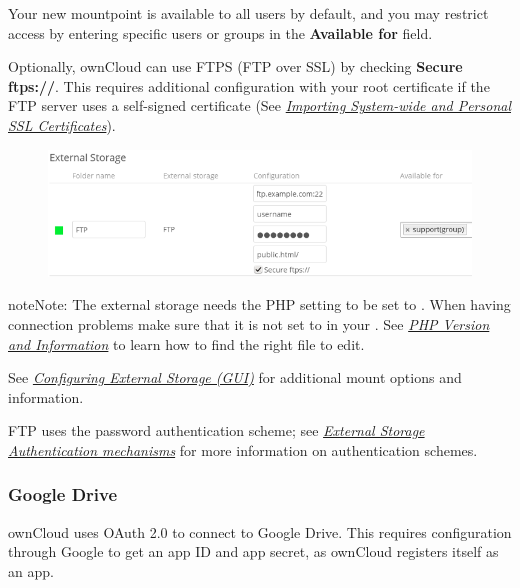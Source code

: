 \documentclass[letterpaper,10pt,english]{sphinxmanual}
\begin{document}
Your new mountpoint is available to all users by default, and you may restrict
access by entering specific users or groups in the \textbf{Available for} field.

Optionally, ownCloud can use FTPS (FTP over SSL) by checking \textbf{Secure ftps://}.
This requires additional configuration with your root certificate if the FTP
server uses a self-signed certificate (See {\hyperref[configuration_server/import_ssl_cert::doc]{\emph{Importing System-wide and Personal SSL Certificates}}}).
\begin{figure}[htbp]
\centering

\includegraphics{ftp.png}
\end{figure}

\begin{notice}{note}{Note:}
The external storage  needs the  PHP
setting to be set to . When having connection problems make sure that it
is not set to  in your . See {\hyperref[issues/general_troubleshooting:label-phpinfo]{\emph{PHP Version and Information}}} to learn
how to find the right  file to edit.
\end{notice}

See {\hyperref[configuration_files/external_storage_configuration_gui::doc]{\emph{Configuring External Storage (GUI)}}} for additional mount
options and information.

FTP uses the password authentication scheme; see {\hyperref[configuration_files/external_storage/auth_mechanisms::doc]{\emph{External Storage Authentication mechanisms}}} for
more information on authentication schemes.


\subsubsection{Google Drive}
\label{configuration_files/external_storage/google:google-drive}\label{configuration_files/external_storage/google::doc}
ownCloud uses OAuth 2.0 to connect to Google Drive. This requires configuration
through Google to get an app ID and app secret, as ownCloud registers itself
as an app.
\end{document}
